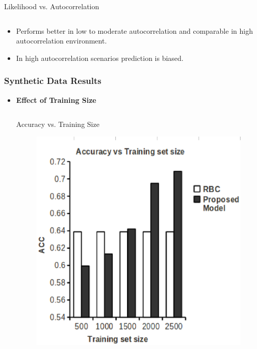 \documentclass[10pt, blue,subsection=true, compress]{beamer}
\begin{document}
\begin{frame}
\begin{itemize}
\begin{columns}[t]
\begin{block}{Likelihood vs. Autocorrelation}
\end{block}
\end{columns}
\end{itemize}
\begin{itemize}
\item Performs better in low to moderate autocorrelation and comparable in high autocorrelation environment.
\item In high autocorrelation scenarios prediction is biased.
\end{itemize}
\end{frame}

\begin{frame}\frametitle{Synthetic Data Results}
\begin{itemize}
\item \textbf{Effect of Training Size}
\begin{columns}[t]

\begin{block}{Accuracy vs. Training Size}
\begin{figure}[htbp]
\centering
\includegraphics[scale=0.25]{img/acc-ts.eps}
\end{figure}
\end{block}



\end{columns}
\end{itemize}
\end{frame}
\end{document}
